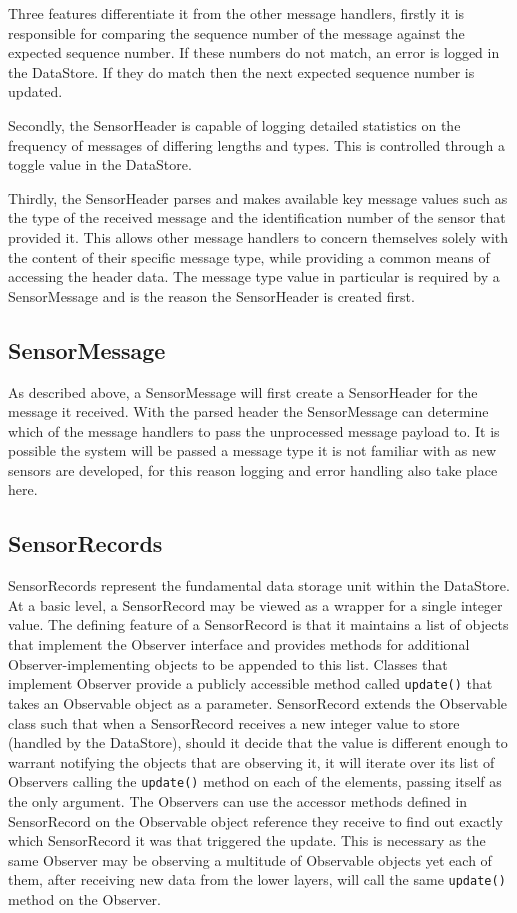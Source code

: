 \documentclass[conference,a4paper]{IEEEtran}
\begin{document}
Three features differentiate it from the other message handlers, firstly it is responsible for comparing the sequence number of the message against the expected sequence number. If these numbers do not match, an error is logged in the DataStore. If they do match then the next expected sequence number is updated.

Secondly, the SensorHeader is capable of logging detailed statistics on the frequency of messages of differing lengths and types. This is controlled through a toggle value in the DataStore. 

Thirdly, the SensorHeader parses and makes available key message values such as the type of the received message and the identification number of the sensor that provided it. This allows other message handlers to concern themselves solely with the content of their specific message type, while providing a common means of accessing the header data. The message type value in particular is required by a SensorMessage and is the reason the SensorHeader is created first.

\subsection{SensorMessage}
As described above, a SensorMessage will first create a SensorHeader for the message it received. With the parsed header the SensorMessage can determine which of the message handlers to pass the unprocessed message payload to. It is possible the system will be passed a message type it is not familiar with as new sensors are developed, for this reason logging and error handling also take place here.

\subsection{SensorRecords}
SensorRecords represent the fundamental data storage unit within the DataStore. At a basic level, a SensorRecord may be viewed as a wrapper for a single integer value. The defining feature of a SensorRecord is that it maintains a list of objects that implement the Observer interface and provides methods for additional Observer-implementing objects to be appended to this list. Classes that implement Observer provide a publicly accessible method called \verb#update()# that takes an Observable object as a parameter. SensorRecord extends the Observable class such that when a SensorRecord receives a new integer value to store (handled by the DataStore), should it decide that the value is different enough to warrant notifying the objects that are observing it, it will iterate over its list of Observers calling the \verb#update()# method on each of the elements, passing itself as the only argument. The Observers can use the accessor methods defined in SensorRecord on the Observable object reference they receive to find out exactly which SensorRecord it was that triggered the update. This is necessary as the same Observer may be observing a multitude of Observable objects yet each of them, after receiving new data from the lower layers, will call the same \verb#update()# method on the Observer.
\end{document}
